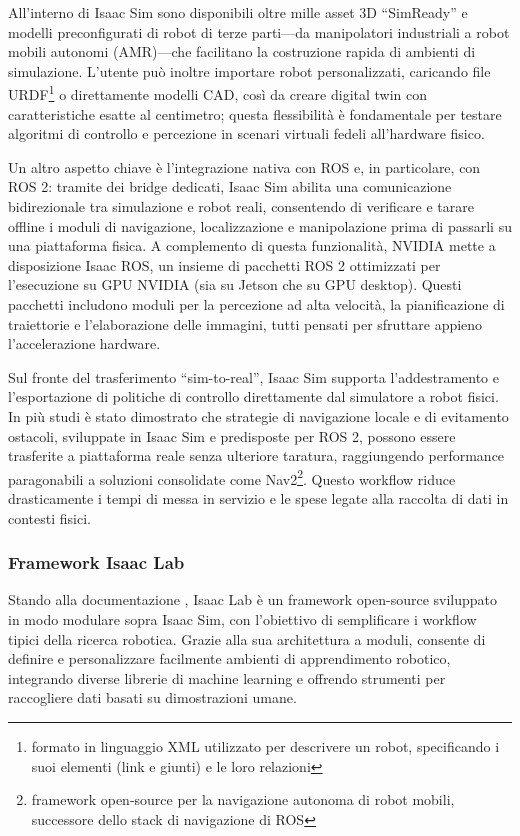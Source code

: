 All’interno di Isaac Sim sono disponibili oltre mille asset 3D “SimReady” e modelli preconfigurati di robot di terze parti—da manipolatori industriali a robot mobili autonomi (AMR)—che facilitano la costruzione rapida di ambienti di simulazione. L’utente può inoltre importare robot personalizzati, caricando file URDF\footnote{formato in linguaggio XML utilizzato per descrivere un robot, specificando i suoi elementi (link e giunti) e le loro relazioni} o direttamente modelli CAD, così da creare digital twin con caratteristiche esatte al centimetro; questa flessibilità è fondamentale per testare algoritmi di controllo e percezione in scenari virtuali fedeli all’hardware fisico.

Un altro aspetto chiave è l’integrazione nativa con ROS e, in particolare, con ROS 2: tramite dei bridge dedicati, Isaac Sim abilita una comunicazione bidirezionale tra simulazione e robot reali, consentendo di verificare e tarare offline i moduli di navigazione, localizzazione e manipolazione prima di passarli su una piattaforma fisica. A complemento di questa funzionalità, NVIDIA mette a disposizione Isaac ROS, un insieme di pacchetti ROS 2 ottimizzati per l’esecuzione su GPU NVIDIA (sia su Jetson che su GPU desktop). Questi pacchetti includono moduli per la percezione ad alta velocità, la pianificazione di traiettorie e l’elaborazione delle immagini, tutti pensati per sfruttare appieno l’accelerazione hardware.

Sul fronte del trasferimento “sim-to-real”, Isaac Sim supporta l’addestramento e l’esportazione di politiche di controllo direttamente dal simulatore a robot fisici. In più studi è stato dimostrato che strategie di navigazione locale e di evitamento ostacoli, sviluppate in Isaac Sim e predisposte per ROS 2, possono essere trasferite a piattaforma reale senza ulteriore taratura, raggiungendo performance paragonabili a soluzioni consolidate come Nav2\footnote{framework open-source per la navigazione autonoma di robot mobili, successore dello stack di navigazione di ROS}. Questo workflow riduce drasticamente i tempi di messa in servizio e le spese legate alla raccolta di dati in contesti fisici.


\subsubsection{Framework Isaac Lab}
Stando alla documentazione \cite{nvidiaIsaacLab2025}, Isaac Lab è un framework open-source sviluppato in modo modulare sopra Isaac Sim, con l’obiettivo di semplificare i workflow tipici della ricerca robotica. Grazie alla sua architettura a moduli, consente di definire e personalizzare facilmente ambienti di apprendimento robotico, integrando diverse librerie di machine learning e offrendo strumenti per raccogliere dati basati su dimostrazioni umane.

